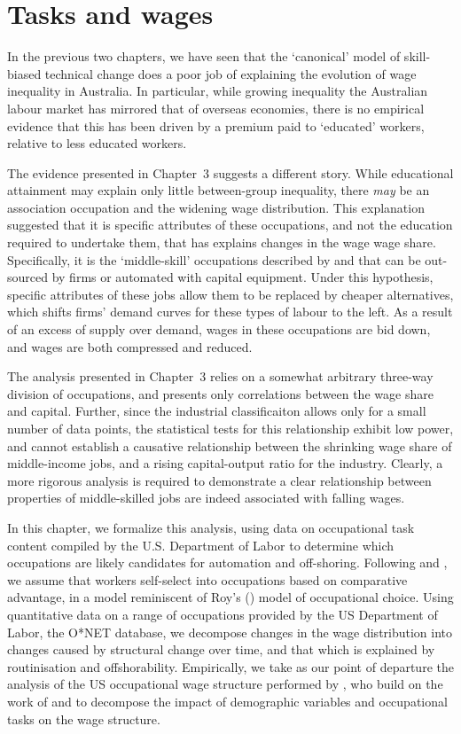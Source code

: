 \chapter{Tasks and wages}

In the previous two chapters, we have seen that the `canonical' model of skill-biased technical change does a poor job of explaining the evolution of wage inequality in Australia. In particular, while growing inequality the Australian labour market has mirrored that of overseas economies, there is no empirical evidence that this has been driven by a premium paid to `educated' workers, relative to less educated workers. 

The evidence presented in Chapter~3 suggests a different story. While educational attainment may explain only little between-group inequality, there {\em may} be an association occupation and the widening wage distribution. This explanation suggested that it is specific attributes of these occupations, and not the education required to undertake them, that has explains changes in the wage wage share. Specifically, it is the `middle-skill' occupations described by \citet{Levy2003} and \citet{Goos2009} that can be out-sourced by firms or automated with capital equipment. Under this hypothesis,  specific attributes of these jobs allow them to be replaced by cheaper alternatives, which shifts firms' demand curves for these types of labour to the left. As a result of an excess of supply over demand, wages in these occupations are bid down, and wages are both compressed and reduced. 

The analysis presented in Chapter~3 relies on a somewhat arbitrary three-way division of occupations, and presents only correlations between the wage share and capital. Further, since the industrial classificaiton allows only for a small number of data points, the statistical tests for this relationship exhibit low power, and cannot establish a causative relationship between the shrinking wage share of middle-income jobs, and a rising capital-output ratio for the industry. Clearly, a more rigorous analysis is required to demonstrate a clear relationship between properties of middle-skilled jobs are indeed associated with falling wages.

In this chapter, we formalize this analysis, using data on occupational task content compiled by the U.S. Department of Labor to determine which occupations are likely candidates for automation and off-shoring. Following \citet{Autor2012} and \citet{Fortin2011}, we assume that workers self-select into occupations based on comparative advantage, in a model reminiscent of Roy's (\citeyear{Roy1951}) model of occupational choice. Using quantitative data on a range of occupations provided by the US Department of Labor, the O*NET database, we decompose changes in the wage distribution into changes caused by structural change over time, and that which is explained by routinisation and offshorability. Empirically, we take as our point of departure the analysis of the US occupational wage structure performed by \citet{Fortin2011}, who build on the work of \citet{Oaxaca1973} and \citet{Juhn1993} to decompose the impact of demographic variables and occupational tasks on the wage structure.

